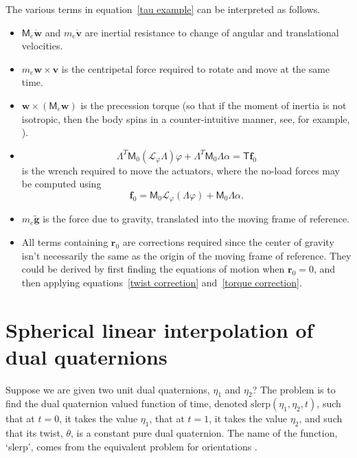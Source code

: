 \documentclass[reqno,12pt]{amsart}
\newcommand{\liederiv}{\mathcal L}
\begin{document}
The various terms in equation~\eqref{tau example} can be interpreted as follows.
\begin{itemize}
\item $\mathsf M_e \dot{\bm w}$ and $m_e \dot{\bm v}$ are inertial resistance to change of angular and translational velocities.
\item $m_e \bm w \times \bm v$ is the centripetal force required to rotate and move at the same time.
\item $\bm w \times (\mathsf M_e \bm w)$ is the precession torque (so that if the moment of inertia is not isotropic, then the body spins in a counter-intuitive manner, see, for example, \cite{kawano-et-al}).
\item
\begin{equation}
\mathsf \Lambda^T \mathsf M_0 (\liederiv_\varphi \mathsf \Lambda) \varphi + \mathsf\Lambda^T \mathsf M_0 \mathsf \Lambda \alpha = \mathsf T \bm f_0
\end{equation}
is the wrench required to move the actuators, where the no-load forces may be computed using
\begin{equation}
\bm f_0 = \mathsf M_0 \liederiv_\varphi(\mathsf\Lambda \varphi) + \mathsf M_0 \mathsf\Lambda \alpha .
\end{equation}
\item $m_e \tilde{\bm g}$ is the force due to gravity, translated into the moving frame of reference.
\item All terms containing $\bm r_0$ are corrections required since the center of gravity isn't necessarily the same as the origin of the moving frame of reference.  They could be derived by first finding the equations of motion when $\bm r_0 = 0$, and then applying equations~\eqref{twist correction} and~\eqref{torque correction}.
\end{itemize}

\section{Spherical linear interpolation of dual quaternions}
\label{sec fun dq}

Suppose we are given two unit dual quaternions, $\eta_1$ and $\eta_2$?  The problem is to find the dual quaternion valued function of time, denoted $\text{slerp}(\eta_1, \eta_2, t)$, such that at $t = 0$, it takes the value $\eta_1$, that at $t = 1$, it takes the value $\eta_2$, and such that its twist, $\theta$, is a constant pure dual quaternion.  The name of the function, `slerp', comes from the equivalent problem for orientations \cite{shoemake}.
\end{document}
